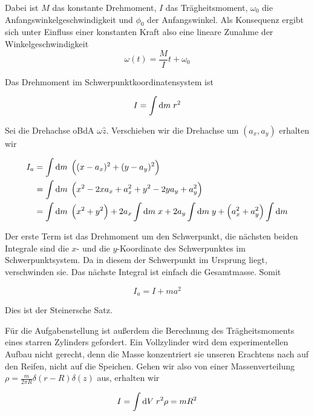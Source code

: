 \documentclass[a4paper,german,12pt,smallheadings]{scrartcl}
\begin{document}
Dabei ist $M$ das konstante Drehmoment, $I$ das Trägheitsmoment, $\omega_0$ die
Anfangswinkelgeschwindigkeit und $\phi_0$ der Anfangswinkel. Als Konsequenz
ergibt sich unter Einfluss einer konstanten Kraft also eine lineare Zunahme der
Winkelgeschwindigkeit
\begin{equation}
  \omega(t) = \frac{M}{I} t + \omega_0
\end{equation}

Das Drehmoment im Schwerpunktkoordinatensystem ist

\begin{equation}
  I = \int \dif m \; r^2
\end{equation}

Sei die Drehachse oBdA $\omega \hat{z}$. Verschieben wir die Drehachse um
$(a_x, a_y)$ erhalten wir

\begin{align*}
  I_a &= \int \dif m \; \del{(x - a_x)^2 + (y - a_y)^2} \\
      &= \int \dif m \; \del{x^2 - 2xa_x + a_x^2 + y^2 - 2ya_y + a_y^2} \\
      &= \int \dif m \; \del{x^2 + y^2}
       + 2 a_x \int \dif m \; x
       + 2 a_y \int \dif m \; y
       + \del{a_x^2 + a_y^2} \int \dif m
\end{align*}

Der erste Term ist das Drehmoment um den Schwerpunkt, die nächsten beiden
Integrale sind die $x$- und die $y$-Koordinate des Schwerpunktes im
Schwerpunktsystem. Da in diesem der Schwerpunkt im Ursprung liegt, verschwinden
sie. Das nächste Integral ist einfach die Gesamtmasse. Somit

\begin{equation}
  I_a = I + ma^2
\end{equation}

Dies ist der Steinersche Satz.

Für die Aufgabenstellung ist außerdem die Berechnung des Trägheitsmoments eines
starren Zylinders gefordert. Ein Vollzylinder wird dem experimentellen Aufbau
nicht gerecht, denn die Masse konzentriert sie unseren Erachtens nach auf den
Reifen, nicht auf die Speichen. Gehen wir also von einer Massenverteilung $\rho
= \frac{m}{2 \pi R} \delta(r-R)\delta(z)$ aus, erhalten wir

\begin{equation}
  I = \int \dif V \; r^2 \rho = m R^2
\end{equation}
\end{document}
